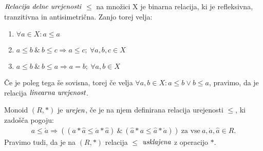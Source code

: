 \documentclass[mat1]{fmfdelo}
\newcommand{\pojem}[1]{\ensuremath{\emph{#1}}}
\begin{document}
\begin{definicija}
	\pojem{Relacija delne urejenosti} $\leq$ na množici X je binarna relacija, ki je refleksivna, tranzitivna in antisimetrična. Zanjo torej velja:
	\begin{enumerate}
		\item $\forall a \in X: a \leq a$
		\item $a\leq b~\&~b\leq c \Rightarrow a\leq c;~\forall a, b, c\in X$
		\item $a\leq b~\&~b\leq a \Rightarrow a = b;~\forall a, b\in X$
	\end{enumerate}
Če je poleg tega še sovisna, torej če velja $\forall a, b \in X: a \leq b \lor b \leq a$, pravimo, da je relacija \pojem{linearna urejenost}.
\end{definicija}
\begin{definicija}
	Monoid $(R, \ast)$ je \pojem{urejen}, če je na njem definirana relacija urejenosti $\leq$, ki zadošča pogoju: \begin{align*} 
	a \leq \acute{a} \Rightarrow ((a \ast \hat{a} \leq \acute{a} \ast \hat{a})~\&~(\hat{a} \ast a \leq \hat{a}\ast \acute{a})) ~\text{za vse}~a, \acute{a},\hat{a}\in R.
\end{align*}
	Pravimo tudi, da je na $(R, \ast)$ relacija $\leq$ \pojem{usklajena} z operacijo $\ast$.
\end{definicija}
\end{document}
